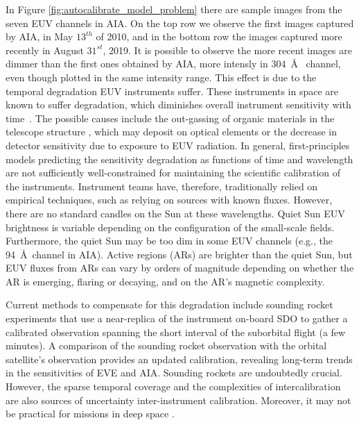 \documentclass[twocolumn,usenames,dvipsnames]{aastex63}
\begin{document}
In Figure \ref{fig:autocalibrate_model_problem} there are sample images from the seven EUV channels in AIA. On the top row we observe the first images captured by AIA, in May $13^{th}$ of 2010, and in the bottom row the images captured more recently in August $31^{st}$, 2019. It is possible to observe the more recent images are dimmer than the first ones obtained by AIA, more intensly in 304~\AA~ channel, even though plotted in the same intensity range. This effect is due to the temporal degradation EUV instruments suffer. These instruments in space are known to suffer degradation, which diminishes overall instrument sensitivity with time~\citep[e.g.,][]{BenMoussa_etal_2013}. The possible causes include the out-gassing of organic materials in the telescope structure \citep{Jiao_2019}, which may deposit on optical elements or the decrease in detector sensitivity due to exposure to EUV radiation. In general, first-principles models predicting the sensitivity degradation as functions of time and wavelength are not sufficiently well-constrained for maintaining the scientific calibration of the instruments. Instrument teams have, therefore, traditionally relied on empirical techniques, such as relying on sources with known fluxes. However, there are no standard candles on the Sun at these wavelengths. Quiet Sun EUV brightness is variable depending on the configuration of the small-scale fields. Furthermore, the quiet Sun may be too dim in some EUV channels (e.g., the 94~\AA\ channel in AIA). Active regions (ARs) are brighter than the quiet Sun, but EUV fluxes from ARs can vary by orders of magnitude depending on whether the AR is emerging, flaring or decaying, and on the AR's magnetic complexity.

 Current methods to compensate for this degradation include sounding rocket experiments \citep{EVE_rocket} that use a near-replica of the instrument on-board SDO to gather a calibrated observation spanning the short interval of the suborbital flight (a few minutes). A comparison of the sounding rocket observation with the orbital satellite’s observation provides an updated calibration, revealing long-term trends in the sensitivities of EVE and AIA. Sounding rockets are undoubtedly crucial. However, the sparse temporal coverage and the complexities of intercalibration are also sources of uncertainty inter-instrument calibration. Moreover, it may not be practical for missions in deep space \citep[e.g., STEREO,][]{Kaiser_2008}.
 
\end{document}
